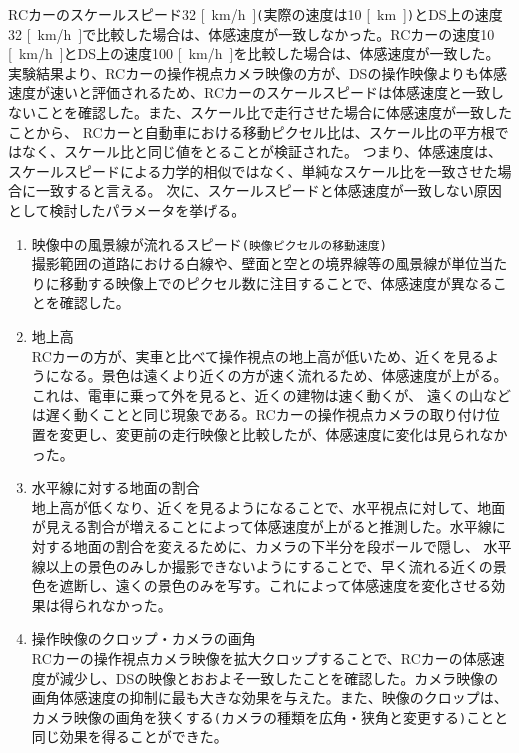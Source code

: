 RCカーのスケールスピード32 \si{[km/h]}\verb|(|実際の速度は10 \si{[km]}\verb|)|とDS上の速度32 \si{[km/h]}で比較した場合は、体感速度が一致しなかった。RCカーの速度10 \si{[km/h]}とDS上の速度100 \si{[km/h]}を比較した場合は、体感速度が一致した。
実験結果より、RCカーの操作視点カメラ映像の方が、DSの操作映像よりも体感速度が速いと評価されるため、RCカーのスケールスピードは体感速度と一致しないことを確認した。また、スケール比で走行させた場合に体感速度が一致したことから、
RCカーと自動車における移動ピクセル比は、スケール比の平方根ではなく、スケール比と同じ値をとることが検証された。
つまり、体感速度は、スケールスピードによる力学的相似ではなく、単純なスケール比を一致させた場合に一致すると言える。
次に、スケールスピードと体感速度が一致しない原因として検討したパラメータを挙げる。

\begin{enumerate}
  \item 映像中の風景線が流れるスピード\verb|(映像ピクセルの移動速度)|\\
  撮影範囲の道路における白線や、壁面と空との境界線等の風景線が単位当たりに移動する映像上でのピクセル数に注目することで、体感速度が異なることを確認した。
  \item 地上高\\
  RCカーの方が、実車と比べて操作視点の地上高が低いため、近くを見るようになる。景色は遠くより近くの方が速く流れるため、体感速度が上がる。これは、電車に乗って外を見ると、近くの建物は速く動くが、
  遠くの山などは遅く動くことと同じ現象である。RCカーの操作視点カメラの取り付け位置を変更し、変更前の走行映像と比較したが、体感速度に変化は見られなかった。
  \item 水平線に対する地面の割合\\
  地上高が低くなり、近くを見るようになることで、水平視点に対して、地面が見える割合が増えることによって体感速度が上がると推測した。水平線に対する地面の割合を変えるために、カメラの下半分を段ボールで隠し、
  水平線以上の景色のみしか撮影できないようにすることで、早く流れる近くの景色を遮断し、遠くの景色のみを写す。これによって体感速度を変化させる効果は得られなかった。
  \item 操作映像のクロップ・カメラの画角\\
  RCカーの操作視点カメラ映像を拡大クロップすることで、RCカーの体感速度が減少し、DSの映像とおおよそ一致したことを確認した。カメラ映像の画角体感速度の抑制に最も大きな効果を与えた。また、映像のクロップは、カメラ映像の画角を狭くする\verb|(|カメラの種類を広角・狭角と変更する\verb|)|ことと同じ効果を得ることができた。
\end{enumerate}

